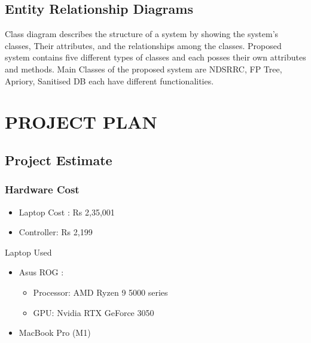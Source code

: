\documentclass[12pt]{report}
\begin{document}
\clearpage
\justifying
\setlength{\parindent}{4em}
\setlength{\parskip}{0.5em}
\renewcommand{\baselinestretch}{1.5}
\normalsize
\subsection{ Entity Relationship Diagrams}
Class diagram describes the structure of a system by showing the system’s classes, Their
attributes, and the relationships among the classes. Proposed system contains five different 
types of classes and each posses their own attributes and methods. Main Classes of the 
proposed system are NDSRRC, FP Tree, Apriory, Sanitised DB each have different 
functionalities.
\vspace{1.5cm}

\clearpage
\centering
\section{PROJECT PLAN}
\justifying
\setlength{\parindent}{4em}
\setlength{\parskip}{0.5em}
\renewcommand{\baselinestretch}{1.5}
\subsection{Project Estimate}
\subsubsection{Hardware Cost}

\begin{itemize}
\item Laptop Cost : Rs 2,35,001 
\item	Controller:  Rs 2,199
\end{itemize}
Laptop Used 
\begin{itemize}
\item Asus ROG :
\begin{itemize}
\item Processor: AMD  Ryzen 9 5000 series
\item GPU: Nvidia RTX GeForce 3050
\end{itemize}
\item MacBook Pro (M1) 
\end{itemize}
\end{document}
